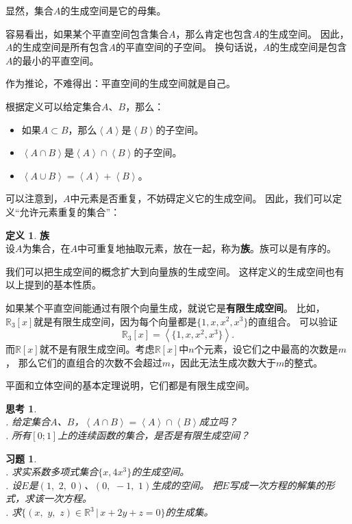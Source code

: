 \documentclass[12pt,UTF8]{ctexbook}
\newcommand{\vect}[1]{\left\langle #1 \right\rangle}
\theoremstyle{definition}
\newtheorem{df}{定义}[section]
\theoremstyle{plain}
\newtheorem{sk}{思考}[section]
\newtheorem{xt}{习题}[section]
\begin{document}
显然，集合$A$的生成空间是它的母集。

容易看出，如果某个平直空间包含集合$A$，那么肯定也包含$A$的生成空间。
因此，$A$的生成空间是所有包含$A$的平直空间的子空间。
换句话说，$A$的生成空间是包含$A$的最小的平直空间。

作为推论，不难得出：平直空间的生成空间就是自己。

根据定义可以给定集合$A$、$B$，那么：
\begin{itemize}
    \item 如果$A\subset B$，那么$\vect{A}$是$\vect{B}$的子空间。
    \item $\vect{A\cap B}$是$\vect{A}\cap\vect{B}$的子空间。
    \item $\vect{A\cup B} = \vect{A} + \vect{B}$。
\end{itemize}

可以注意到，$A$中元素是否重复，不妨碍定义它的生成空间。
因此，我们可以定义“允许元素重复的集合”：
\begin{df}{\textbf{族}}
    \mbox{} \\
    设$A$为集合，在$A$中可重复地抽取元素，放在一起，称为\textbf{族}。族可以是有序的。
\end{df}
我们可以把生成空间的概念扩大到向量族的生成空间。
这样定义的生成空间也有以上提到的基本性质。

如果某个平直空间能通过有限个向量生成，就说它是\textbf{有限生成空间}。
比如，$\mathbb{R}_3[x]$就是有限生成空间，因为每个向量都是$\{1, x, x^2, x^3\}$的直组合。
可以验证
$$\mathbb{R}_3[x] = \vect{\{1, x, x^2, x^3\}}.$$
而$\mathbb{R}[x]$就不是有限生成空间。考虑$\mathbb{R}[x]$中$n$个元素，设它们之中最高的次数是$m$，
那么它们的直组合的次数不会超过$m$，因此无法生成次数大于$m$的整式。

平面和立体空间的基本定理说明，它们都是有限生成空间。

\begin{sk}
    \mbox{} \\
    . 给定集合$A$、$B$，$\vect{A\cap B} = \vect{A}\cap\vect{B}$成立吗？\\
    . 所有$[0;1]$上的连续函数的集合，是否是有限生成空间？
\end{sk}

\begin{xt}
    \mbox{} \\
    . 求实系数多项式集合$\{x, 4x^3\}$的生成空间。\\
    . 设$E$是$(1, \,\,2, \,\,0)$、$(0, \,\,-1, \,\,1)$生成的空间。
    把$E$写成一次方程的解集的形式，求该一次方程。\\
    . 求$\{(x,\,\,y,\,\,z)\in\mathbb{R}^3 \, | \, x + 2y + z = 0 \}$的生成集。
    
\end{xt}
\end{document}
